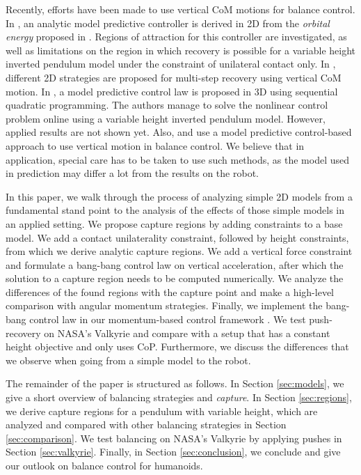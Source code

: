 \documentclass[letterpaper, 10 pt, conference]{ieeeconf}  %
\begin{document}
Recently, efforts have been made to use vertical CoM motions for balance control. In \cite{koolen2016balance}, an analytic model predictive controller is derived in 2D from the \textit{orbital energy} proposed in \cite{pratt2007derivation}. Regions of attraction for this controller are investigated, as well as limitations on the region in which recovery is possible for a variable height inverted pendulum model under the constraint of unilateral contact only. In \cite{gao2017increase}, different 2D strategies are proposed for multi-step recovery using vertical CoM motion. In \cite{caron2018balance}, a model predictive control law is proposed in 3D using sequential quadratic programming. The authors manage to solve the nonlinear control problem online using a variable height inverted pendulum model. However, applied results are not shown yet. Also, \cite{koolen2016balance} and \cite{caron2018balance} use a model predictive control-based approach to use vertical motion in balance control. We believe that in application, special care has to be taken to use such methods, as the model used in prediction may differ a lot from the results on the robot.

In this paper, we walk through the process of analyzing simple 2D models from a fundamental stand point to the analysis of the effects of those simple models in an applied setting. We propose capture regions by adding constraints to a base model. We add a contact unilaterality constraint, followed by height constraints, from which we derive analytic capture regions. We add a vertical force constraint and formulate a bang-bang control law on vertical acceleration, after which the solution to a capture region needs to be computed numerically. We analyze the differences of the found regions with the capture point and make a high-level comparison with angular momentum strategies. Finally, we implement the bang-bang control law in our momentum-based control framework \cite{koolen2016design}. We test push-recovery on NASA's Valkyrie \cite{radford2015valkyrie} and compare with a setup that has a constant height objective and only uses CoP. Furthermore, we discuss the differences that we observe when going from a simple model to the robot.

The remainder of the paper is structured as follows. In Section \ref{sec:models}, we give a short overview of balancing strategies  and \textit{capture}. In Section \ref{sec:regions}, we derive capture regions for a pendulum with variable height, which are analyzed and compared with other balancing strategies in Section \ref{sec:comparison}. We test balancing on NASA's Valkyrie by applying pushes in Section \ref{sec:valkyrie}. Finally, in Section \ref{sec:conclusion}, we conclude and give our outlook on balance control for humanoids.
\end{document}
